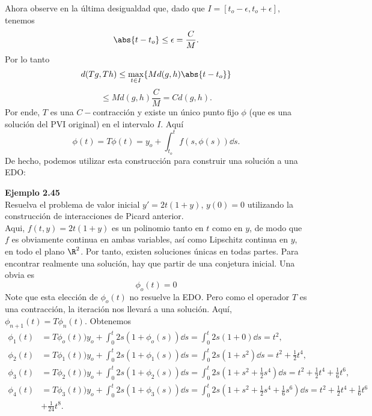 Ahora observe en la última desigualdad que, dado que $I = [t_o - \epsilon ,t_o + \epsilon]$, tenemos
	$$ \abs{t - t_o} \leq \epsilon = \frac{C}{M}. $$
Por lo tanto
	$$ d(Tg,Th) \leq \max _{t\in I} \{ M d(g,h) \abs{t - t_o} \} $$
	$$ \leq Md(g,h) \frac{C}{M} = Cd(g,h). $$
Por ende, $T$ es una $C-$contracción y existe un único punto fijo $\phi$ (que es una solución del PVI original) en el intervalo $I$. Aquí
	$$ \phi (t) = T\phi (t) = y_o + \int _{t_o} ^t f(s,\phi (s)) \dd{s}. $$
De hecho, podemos utilizar esta construcción para construir una solución a una EDO:


\begin{mdframed}[style=warning]
	\begin{tcolorbox}[arc=0mm,boxrule=0pt,colframe=white,colback=lightgray!25]
		{\large \textbf{Ejemplo 2.45}} \\
		Resuelva el problema de valor inicial $y' = 2t(1 + y),\, y(0) = 0$ utilizando la construcción de interacciones de Picard anterior. \\
		Aqui, $f(t,y) = 2t(1+y)$ es un polinomio tanto en $t$ como en $y$, de modo que $f$ es obviamente continua en ambas variables, así como Lipschitz continua en $y$, en todo el plano $\R ^2$. Por tanto, existen soluciones únicas en todas partes. Para encontrar realmente una solución, hay que partir de una conjetura inicial. Una obvia es 
			$$\phi _o (t) = 0 $$
		Note que esta elección de $\phi _o (t)$ no resuelve la EDO. Pero como el operador $T$ es una contracción, la iteración nos llevará a una solución. Aquí, $\phi _{n + 1} (t) = T\phi _{n} (t)$. Obtenemos
		\begin{align*}
			\phi _1 (t) &= T\phi _o (t) ) y_o + \int _0 ^t 2s(1 + \phi _o (s)) \dd{s} = \int _0 ^t 2s (1 + 0) \dd{s} = t^2, \\
			\phi _2 (t) &= T\phi _1 (t) ) y_o + \int _0 ^t 2s(1 + \phi _1 (s)) \dd{s} = \int _0 ^t 2s (1 + s^2) \dd{s} = t^2 + \frac{1}{2} t^4, \\
			\phi _3 (t) &= T\phi _2 (t) ) y_o + \int _0 ^t 2s(1 + \phi _2 (s)) \dd{s} = \int _0 ^t 2s (1 + s^2 + \frac{1}{2} s^4) \dd{s} = t^2 + \frac{1}{2} t^4 + \frac{1}{6} t^6, \\
			\phi _4 (t) &= T\phi _3 (t) ) y_o + \int _0 ^t 2s(1 + \phi _3 (s)) \dd{s} = \int _0 ^t 2s (1 + s^2 + \frac{1}{2} s^4 + \frac{1}{6} s^6) \dd{s} = t^2 + \frac{1}{2} t^4 + \frac{1}{6} t^6 \\
			&+ \frac{1}{24} t^8.
		\end{align*}
	\end{tcolorbox}
\end{mdframed}




